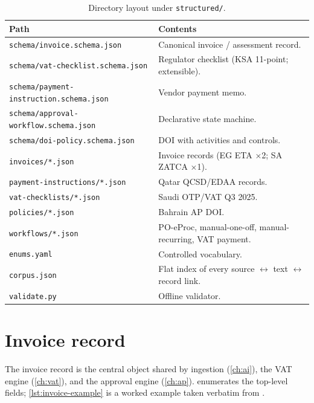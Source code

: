 \documentclass[11pt,a4paper,twoside]{report}
\newcommand{\corpus}{}
\begin{document}
\begin{table}[htbp]
\centering
\caption{Directory layout under \corpus\texttt{structured/}.}
\label{tab:layout}
\small
\begin{tabularx}{\linewidth}{@{}l X@{}}
\toprule
\textbf{Path} & \textbf{Contents} \\ \midrule
\texttt{schema/invoice.schema.json}            & Canonical invoice / assessment record. \\
\texttt{schema/vat-checklist.schema.json}      & Regulator checklist (KSA 11-point; extensible). \\
\texttt{schema/payment-instruction.schema.json}& Vendor payment memo. \\
\texttt{schema/approval-workflow.schema.json}  & Declarative state machine. \\
\texttt{schema/doi-policy.schema.json}         & DOI with activities and controls. \\
\texttt{invoices/*.json}                       & Invoice records (EG ETA ×2; SA ZATCA ×1). \\
\texttt{payment-instructions/*.json}           & Qatar QCSD/EDAA records. \\
\texttt{vat-checklists/*.json}                 & Saudi OTP/VAT Q3 2025. \\
\texttt{policies/*.json}                       & Bahrain AP DOI. \\
\texttt{workflows/*.json}                      & PO-eProc, manual-one-off, manual-recurring, VAT payment. \\
\texttt{enums.yaml}                            & Controlled vocabulary. \\
\texttt{corpus.json}                           & Flat index of every source $\leftrightarrow$ text $\leftrightarrow$ record link. \\
\texttt{validate.py}                           & Offline validator. \\ \bottomrule
\end{tabularx}
\end{table}

\section{Invoice record}

The invoice record is the central object shared by ingestion (\cref{ch:ai}),
the VAT engine (\cref{ch:vat}), and the approval engine
(\cref{ch:ap}).  enumerates the top-level
fields; \cref{lst:invoice-example} is a worked example taken verbatim
from \corpus{}.
\end{document}
